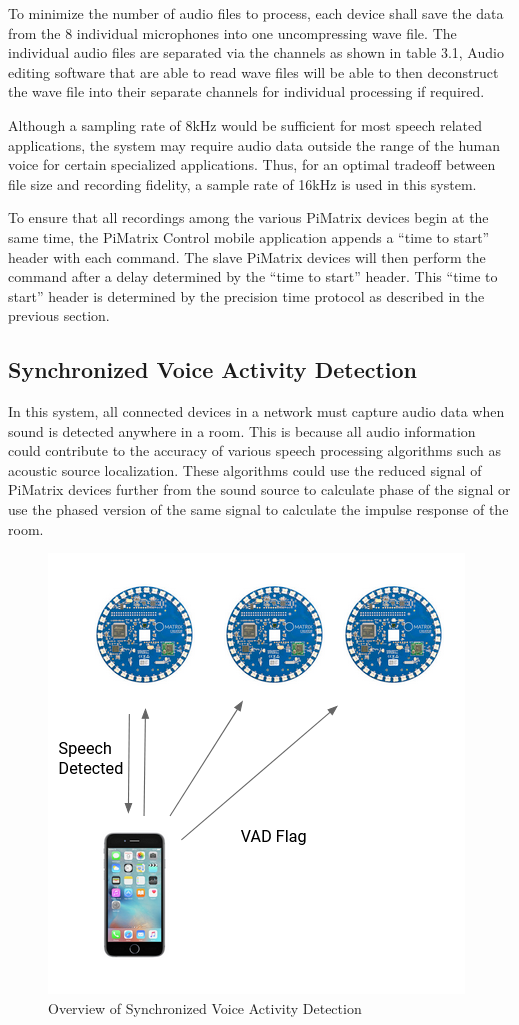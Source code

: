 \documentclass[hidelinks,12pt]{report} %
\begin{document}
To minimize the number of audio files to process, each device shall save the data from the 8 individual microphones into one uncompressing wave file. The individual audio files are separated via the channels as shown in table 3.1, Audio editing software that are able to read wave files will be able to then deconstruct the wave file into their separate channels for individual processing if required. 

Although a sampling rate of 8kHz would be sufficient for most speech related applications\cite{44}, the system may require audio data outside the range of the human voice for certain specialized applications. Thus, for an optimal tradeoff between file size and recording fidelity, a sample rate of 16kHz is used in this system. 

To ensure that all recordings among the various PiMatrix devices begin at the same time, the PiMatrix Control mobile application appends a “time to start” header with each command. The slave PiMatrix devices will then perform the command after a delay determined by the “time to start” header. This “time to start” header is determined by the precision time protocol as described in the previous section.

\subsection{Synchronized Voice Activity Detection}

In this system, all connected devices in a network must capture audio data when sound is detected anywhere in a room. This is because all audio information could contribute to the accuracy of various speech processing algorithms such as acoustic source localization. These algorithms could use the reduced signal of PiMatrix devices further from the sound source to calculate phase of the signal or use the phased version of the same signal to calculate the impulse response of the room\cite{29}. 

\begin{figure}[h]
\centering
\includegraphics[scale = 1.0]{fig3.5} 
\caption{Overview of Synchronized Voice Activity Detection}
\label{fig}
\end{figure}
\end{document}

